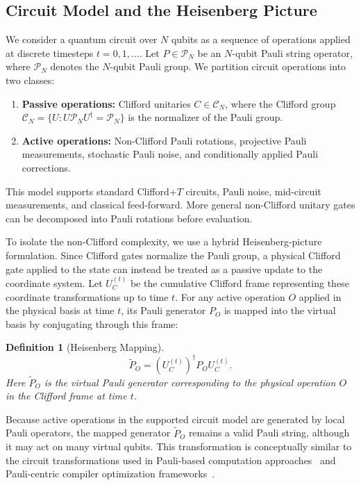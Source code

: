 \documentclass[a4paper, onecolumn, unpublished]{quantumarticle}
\newtheorem{definition}{Definition}
\begin{document}
    \subsection{Circuit Model and the Heisenberg Picture}
    \label{sec:heisenberg}

    We consider a quantum circuit over $N$ qubits as a sequence of operations applied at discrete timesteps $t = 0,1,\ldots$. Let $P \in \mathcal{P}_N$ be an $N$-qubit Pauli string operator, where $\mathcal{P}_N$ denotes the $N$-qubit Pauli group. We partition circuit operations into two classes:
    \begin{enumerate}
        \item \textbf{Passive operations:} Clifford unitaries $C \in \mathcal{C}_N$, where the Clifford group $\mathcal{C}_N = \{U : U \mathcal{P}_N U^\dagger = \mathcal{P}_N\}$ is the normalizer of the Pauli group.
        \item \textbf{Active operations:} Non-Clifford Pauli rotations, projective Pauli measurements, stochastic Pauli noise, and conditionally applied Pauli corrections.
    \end{enumerate}
    This model supports standard Clifford+$T$ circuits, Pauli noise, mid-circuit measurements, and classical feed-forward. More general non-Clifford unitary gates can be decomposed into Pauli rotations before evaluation.

    To isolate the non-Clifford complexity, we use a hybrid Heisenberg-picture formulation. Since Clifford gates normalize the Pauli group, a physical Clifford gate applied to the state can instead be treated as a passive update to the coordinate system. Let $U_C^{(t)}$ be the cumulative Clifford frame representing these coordinate transformations up to time $t$. For any active operation $O$ applied in the physical basis at time $t$, its Pauli generator $P_O$ is mapped into the virtual basis by conjugating through this frame:
    \begin{definition}[Heisenberg Mapping]
    \label{def:heisenberg_map}
    \begin{equation}
        \label{eq:heisenberg_map}
        \tilde{P}_O = (U_C^{(t)})^\dagger P_O U_C^{(t)}.
    \end{equation}
    Here $\tilde{P}_O$ is the virtual Pauli generator corresponding to the physical operation $O$ in the Clifford frame at time $t$.
    \end{definition}

    Because active operations in the supported circuit model are generated by local Pauli operators, the mapped generator $\tilde{P}_O$ remains a valid Pauli string, although it may act on many virtual qubits. This transformation is conceptually similar to the circuit transformations used in Pauli-based computation approaches~\cite{bravyiTradingClassicalQuantum2016,litinskiGameSurfaceCodes2019a} and Pauli-centric compiler optimization frameworks~\cite{liPaulihedralGeneralizedBlockWise2021, paykinPCOASTPaulibasedQuantum2023, wangTableauBasedFramework2025}.
\end{document}

